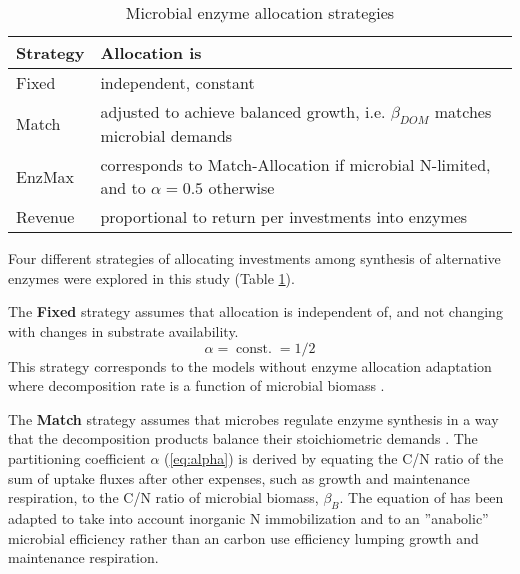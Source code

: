 \begin{table}[t]
\caption{Microbial enzyme allocation strategies \label{tab:AllocStrategies}}
\vskip4mm
\centering
\begin{tabular}{lp{6.5cm}}
\hline
Strategy &  Allocation is \\
\hline
Fixed & independent, constant \\
Match & adjusted to achieve balanced growth, i.e. $\beta_{DOM}$ matches
microbial demands  \\
EnzMax & corresponds to Match-Allocation if microbial N-limited, and
to $\alpha=0.5$ otherwise
\\
Revenue & proportional to return per investments into enzymes \\
\hline
\end{tabular}
\end{table}

Four different strategies of
allocating investments among synthesis of alternative enzymes were explored in this study (Table
\ref{tab:AllocStrategies}).

The \textbf{Fixed} strategy assumes that allocation is independent of,
and not changing with changes in substrate availability.
\begin{equation} 
\label{eq:allocFixed}
\alpha = \operatorname{const.} = 1/2
\end{equation}
This strategy corresponds to the models without enzyme allocation adaptation
where decomposition rate is a function of microbial biomass \citep{Wutzler08}.
 
The \textbf{Match} strategy assumes that microbes regulate enzyme synthesis in a
way that the decomposition products balance their stoichiometric demands
\citep{Moorhead12}. The partitioning coefficient $\alpha$ (\ref{eq:alpha}) is
derived by equating the C/N ratio of the sum of uptake fluxes after
other expenses, such as growth and maintenance respiration, to the
C/N ratio of microbial biomass, $\beta_B$. The equation of \citep{Moorhead12}
has been adapted to take into account inorganic N immobilization and to an
''anabolic'' microbial efficiency rather than an carbon use efficiency lumping
growth and maintenance respiration.

